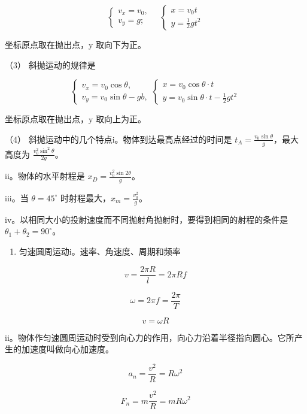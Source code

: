 \[
\left\{ \begin{array}{l} v _ {x} = v _ {0}, \\ v _ {y} = g; \end{array} \right. \quad \left\{ \begin{array}{l} x = v _ {0} t \\ y = \frac {1}{2} g t ^ {2} \end{array} \right.
\]

坐标原点取在抛出点，y 取向下为正。

（3） 斜抛运动的规律是

\[
\left\{ \begin{array}{l} v _ {x} = v _ {0} \cos \theta, \\ v _ {y} = v _ {0} \sin \theta - g b, \end{array} \right. \left\{ \begin{array}{l} x = v _ {0} \cos \theta \cdot t \\ y = v _ {0} \sin \theta \cdot t - \frac {1}{2} g t ^ {2} \end{array} \right.
\]

坐标原点取在抛出点，y 取向上为正。

（4） 斜抛运动中的几个特点i。物体到达最高点经过的时间是
\(t_A = \frac{v_0 \sin \theta}{g}\)，最大高度为
\(\frac{v_0^2 \sin^2 \theta}{2g}\)。

ii。物体的水平射程是 \(x_{D} = \frac{v_{0}^{2}\sin 2\theta}{g}\)。

iii。当 \(\theta = 45^{\circ}\)
时射程最大，\(x_{m} = \frac{v_{0}^{2}}{g}\)。

iv。以相同大小的投射速度而不同抛射角抛射时，要得到相同的射程的条件是
\(\theta_{1} + \theta_{2} = 90^{\circ}\)。

\begin{enumerate}
\def\labelenumi{\arabic{enumi}.}
\setcounter{enumi}{2}
\tightlist
\item
  匀速圆周运动i。速率、角速度、周期和频率
\end{enumerate}

\[
v = \frac {2 \pi R}{l} = 2 \pi R f
\]

\[
\omega = 2 \pi f = \frac {2 \pi}{T}
\]

\[
v = \omega R
\]

ii。物体作匀速圆周运动时受到向心力的作用，向心力沿着半径指向圆心。它所产生的加速度叫做向心加速度。

\[
a _ {n} = \frac {v ^ {2}}{R} = R \omega^ {2}
\]

\[
F _ {n} = m \frac {v ^ {2}}{R} = m R \omega^ {2}
\]

